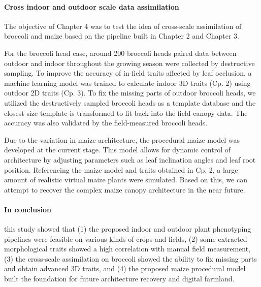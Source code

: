 \begin{eabstract}
 \paragraph{Cross indoor and outdoor scale data assimilation}

  The objective of Chapter 4 was to test the idea of cross-scale assimilation of broccoli and maize based on the pipeline built in Chapter 2 and Chapter 3.

  For the broccoli head case, around 200 broccoli heads paired data between outdoor and indoor throughout the growing season were collected by destructive sampling. To improve the accuracy of in-field traits affected by leaf occlusion, a machine learning model was trained to calculate indoor 3D traits (Cp. 2) using outdoor 2D traits (Cp. 3). To fix the missing parts of outdoor broccoli heads, we utilized the destructively sampled broccoli heads as a template database and the closest size template is transformed to fit back into the field canopy data. The accuracy was also validated by the field-measured broccoli heads.

  Due to the variation in maize architecture, the procedural maize model was developed at the current stage. This model allows for dynamic control of architecture by adjusting parameters such as leaf inclination angles and leaf root position. Referencing the maize model and traits obtained in Cp. 2, a large amount of realistic virtual maize plants were simulated. Based on this, we can attempt to recover the complex maize canopy architecture in the near future.

  \paragraph{In conclusion}
  
  this study showed that (1) the proposed indoor and outdoor plant phenotyping pipelines were feasible on various kinds of crops and fields, (2) some extracted morphological traits showed a high correlation with manual field measurement, (3) the cross-scale assimilation on broccoli showed the ability to fix missing parts and obtain advanced 3D traits, and (4) the proposed maize procedural model built the foundation for future architecture recovery and digital farmland.
  
\end{eabstract}

